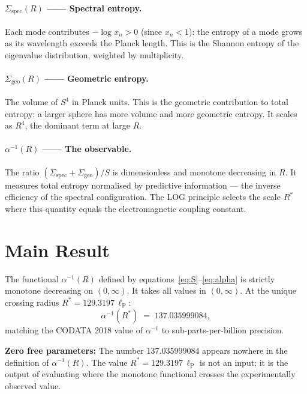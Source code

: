 \documentclass[12pt,a4paper]{article}
\newcommand{\lP}{\ell_{\mathrm{P}}}
\newcommand{\ai}{\alpha^{-1}}
\newcommand{\Sg}{\Sigma_{\mathrm{geo}}}
\newcommand{\Ss}{\Sigma_{\mathrm{spec}}}
\begin{document}
\paragraph{$\Ss(R)$ ------ Spectral entropy.}
Each mode contributes $-\log x_n > 0$ (since $x_n < 1$):
the entropy of a mode grows as its wavelength exceeds
the Planck length.
This is the Shannon entropy of the eigenvalue
distribution, weighted by multiplicity.

\paragraph{$\Sg(R)$ ------ Geometric entropy.}
The volume of $S^4$ in Planck units.
This is the geometric contribution to total entropy:
a larger sphere has more volume and more geometric
entropy.
It scales as $R^4$, the dominant term at large $R$.

\paragraph{$\ai(R)$ ------ The observable.}
The ratio $(\Ss + \Sg)/S$ is dimensionless and
monotone decreasing in $R$.
It measures total entropy normalised by predictive
information --- the inverse efficiency of the
spectral configuration.
The LOG principle selects the scale $R^*$ where this
quantity equals the electromagnetic coupling constant.

\section{Main Result}
\label{sec:main}

\begin{Tbox}
\label{thm:main}
The functional $\ai(R)$ defined by
equations~\eqref{eq:S}--\eqref{eq:alpha}
is strictly monotone decreasing on $(0,\infty)$.
It takes all values in $(0,\infty)$.
At the unique crossing radius $R^* = 129.3197\,\lP$:
\begin{equation}
\boxed{
  \ai(R^*) \;=\; 137.035999084,
}
\end{equation}
matching the CODATA 2018 value of $\alpha^{-1}$
to sub-parts-per-billion precision.

\textbf{Zero free parameters:}
The number $137.035999084$ appears nowhere in the
definition of $\ai(R)$.
The value $R^* = 129.3197\,\lP$ is not an input;
it is the output of evaluating where the monotone
functional crosses the experimentally observed value.
\end{Tbox}
\end{document}
